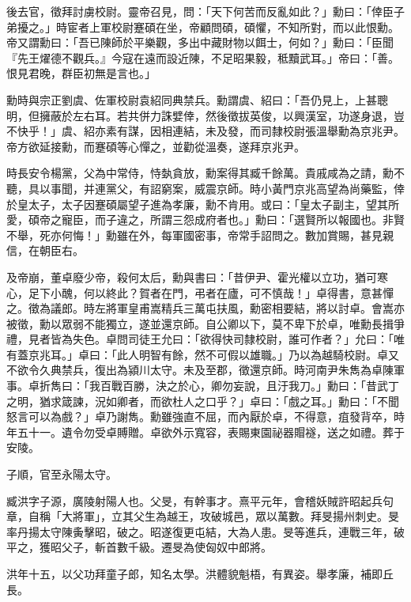 \begin{pinyinscope}
後去官，徵拜討虜校尉。靈帝召見，問：「天下何苦而反亂如此？」勳曰：「倖臣子弟擾之。」時宦者上軍校尉蹇碩在坐，帝顧問碩，碩懼，不知所對，而以此恨勳。帝又謂勳曰：「吾已陳師於平樂觀，多出中藏財物以餌士，何如？」勳曰：「臣聞『先王燿德不觀兵。』今寇在遠而設近陳，不足昭果毅，秪黷武耳。」帝曰：「善。恨見君晚，群臣初無是言也。」

勳時與宗正劉虞、佐軍校尉袁紹同典禁兵。勳謂虞、紹曰：「吾仍見上，上甚聰明，但擁蔽於左右耳。若共併力誅嬖倖，然後徵拔英俊，以興漢室，功遂身退，豈不快乎！」虞、紹亦素有謀，因相連結，未及發，而司隸校尉張溫舉勳為京兆尹。帝方欲延接勳，而蹇碩等心憚之，並勸從溫奏，遂拜京兆尹。

時長安令楊黨，父為中常侍，恃埶貪放，勳案得其臧千餘萬。貴戚咸為之請，勳不聽，具以事聞，并連黨父，有詔窮案，威震京師。時小黃門京兆高望為尚藥監，倖於皇太子，太子因蹇碩屬望子進為孝廉，勳不肯用。或曰：「皇太子副主，望其所愛，碩帝之寵臣，而子違之，所謂三怨成府者也。」勳曰：「選賢所以報國也。非賢不舉，死亦何悔！」勳雖在外，每軍國密事，帝常手詔問之。數加賞賜，甚見親信，在朝臣右。

及帝崩，董卓廢少帝，殺何太后，勳與書曰：「昔伊尹、霍光權以立功，猶可寒心，足下小醜，何以終此？賀者在門，弔者在廬，可不慎哉！」卓得書，意甚憚之。徵為議郎。時左將軍皇甫嵩精兵三萬屯扶風，勳密相要結，將以討卓。會嵩亦被徵，勳以眾弱不能獨立，遂並還京師。自公卿以下，莫不卑下於卓，唯勳長揖爭禮，見者皆為失色。卓問司徒王允曰：「欲得快司隸校尉，誰可作者？」允曰：「唯有蓋京兆耳。」卓曰：「此人明智有餘，然不可假以雄職。」乃以為越騎校尉。卓又不欲令久典禁兵，復出為潁川太守。未及至郡，徵還京師。時河南尹朱雋為卓陳軍事。卓折雋曰：「我百戰百勝，決之於心，卿勿妄說，且汙我刀。」勳曰：「昔武丁之明，猶求箴諫，況如卿者，而欲杜人之口乎？」卓曰：「戲之耳。」勳曰：「不聞怒言可以為戲？」卓乃謝雋。勳雖強直不屈，而內厭於卓，不得意，疽發背卒，時年五十一。遺令勿受卓賻贈。卓欲外示寬容，表賜東園祕器賵襚，送之如禮。葬于安陵。

子順，官至永陽太守。

臧洪字子源，廣陵射陽人也。父旻，有幹事才。熹平元年，會稽妖賊許昭起兵句章，自稱「大將軍」，立其父生為越王，攻破城邑，眾以萬數。拜旻揚州刺史。旻率丹揚太守陳夤擊昭，破之。昭遂復更屯結，大為人患。旻等進兵，連戰三年，破平之，獲昭父子，斬首數千級。遷旻為使匈奴中郎將。

洪年十五，以父功拜童子郎，知名太學。洪體貌魁梧，有異姿。舉孝廉，補即丘長。


\end{pinyinscope}
